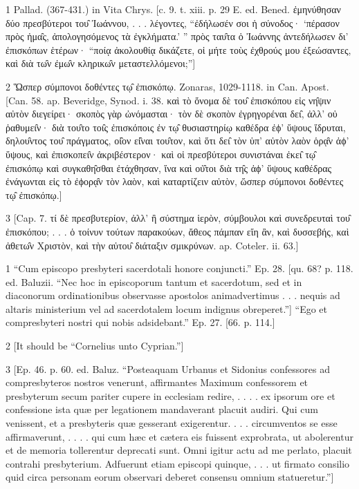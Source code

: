 1
Pallad. (367-431.) in Vita Chrys. [c. 9. t. xiii. p. 29 E. ed. Bened. ἐμηνύθησαν δύο πρεσβύτεροι του̑ Ἰωάννου, . . . λέγοντες, “ἐδήλωσέν σοι ἡ σύνοδος· ‘πέρασον πρὸς ἡμα̑ς, ἀπολογησόμενος τὰ ἐγκλήματα.’ ” πρὸς ταυ̑τα ὁ Ἰωάννης ἀντεδήλωσεν δι’ ἐπισκόπων ἑτέρων· “ποίᾳ ἀκολουθίᾳ δικάζετε, οἱ μήτε τοὺς ἐχθρούς μου ἐξεώσαντες, καὶ διὰ τω̑ν ἐμω̑ν κληρικω̑ν μεταστελλόμενοι;”]

2
Ὥσπερ σύμπονοι δοθέντες τῳ̑ ἐπισκόπῳ. Zonaras, 1029-1118. in Can. Apost. [Can. 58. ap. Beveridge, Synod. i. 38. καὶ τὸ ὄνομα δὲ του̑ ἐπισκόπου εἰς νη̑ψιν αὐτὸν διεγείρει· σκοπὸς γὰρ ὠνόμασται· τὸν δὲ σκοπὸν ἐγρηγορέναι δει̑, ἀλλ’ οὐ ῥαθυμει̑ν· διὰ του̑το τοι̑ς ἐπισκόποις ἐν τῳ̑ θυσιαστηρίῳ καθέδρα ἐϕ’ ὕψους ἵδρυται, δηλου̑ντος του̑ πράγματος, οἱ̑ον εἰ̑ναι του̑τον, καὶ ὅτι δει̑ τὸν ὑπ’ αὐτὸν λαὸν ὁρᾳ̑ν ἀϕ’ ὕψους, καὶ ἐπισκοπει̑ν ἀκριβέστερον· καὶ οἱ πρεσβύτεροι συνιστάναι ἐκει̑ τῳ̑ ἐπισκόπῳ καὶ συγκαθη̑σθαι ἐτάχθησαν, ἵνα καὶ οὑ̑τοι διὰ τη̑ς ἀϕ’ ὕψους καθέδρας ἐνάγωνται εἰς τὸ ἐϕορᾳ̑ν τὸν λαὸν, καὶ καταρτίζειν αὐτὸν, ὥσπερ σύμπονοι δοθέντες τῳ̑ ἐπισκόπῳ.]

3
[Cap. 7. τί δὲ πρεσβυτερίον, ἀλλ’ ἢ σύστημα ἱερὸν, σύμβουλοι καὶ συνεδρευταὶ του̑ ἐπισκόπου; . . . ὁ τοίνυν τούτων παρακούων, ἄθεος πάμπαν εἴη ἂν, καὶ δυσσεβής, καὶ ἀθετω̑ν Χριστὸν, καὶ τὴν αὐτου̑ διάταξιν σμικρύνων. ap. Coteler. ii. 63.]

1
“Cum episcopo presbyteri sacerdotali honore conjuncti.” Ep. 28. [qu. 68? p. 118. ed. Baluzii. “Nec hoc in episcoporum tantum et sacerdotum, sed et in diaconorum ordinationibus observasse apostolos animadvertimus . . . nequis ad altaris ministerium vel ad sacerdotalem locum indignus obreperet.”] “Ego et compresbyteri nostri qui nobis adsidebant.” Ep. 27. [66. p. 114.]

2
[It should be “Cornelius unto Cyprian.”]

3
[Ep. 46. p. 60. ed. Baluz. “Posteaquam Urbanus et Sidonius confessores ad compresbyteros nostros venerunt, affirmantes Maximum confessorem et presbyterum secum pariter cupere in ecclesiam redire, . . . . ex ipsorum ore et confessione ista quæ per legationem mandaverant placuit audiri. Qui cum venissent, et a presbyteris quæ gesserant exigerentur. . . . circumventos se esse affirmaverunt, . . . . qui cum hæc et cætera eis fuissent exprobrata, ut abolerentur et de memoria tollerentur deprecati sunt. Omni igitur actu ad me perlato, placuit contrahi presbyterium. Adfuerunt etiam episcopi quinque, . . . ut firmato consilio quid circa personam eorum observari deberet consensu omnium statueretur.”]

